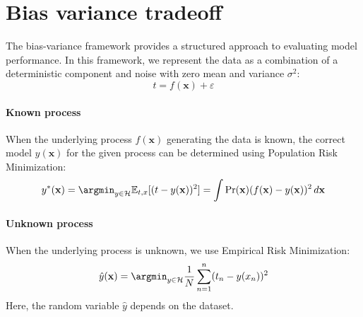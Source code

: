 \section{Bias variance tradeoff}

The bias-variance framework provides a structured approach to evaluating model performance. 
In this framework, we represent the data as a combination of a deterministic component and noise with zero mean and variance $\sigma^2$:
\[t=f(\mathbf{x})+\varepsilon\]

\paragraph*{Known process}
When the underlying process $f(\mathbf{x})$ generating the data is known, the correct model $y(\mathbf{x})$ for the given process can be determined using Population Risk Minimization:
\[y^\ast(\mathbf{x})=\argmin_{y\in\mathcal{H}}\mathbb{E}_{t,x}[(t-y(\mathbf{x}))^2]=\int\Pr(\mathbf{x})(f(\mathbf{x})-y(\mathbf{x}))^2\,d\mathbf{x}\]

\paragraph*{Unknown process}
When the underlying process is unknown, we use Empirical Risk Minimization:
\[\hat{y}(\mathbf{x})=\argmin_{y\in\mathcal{H}}\dfrac{1}{N}\sum_{n=1}^n(t_n-y(x_n))^2\]
Here, the random variable $\hat{y}$ depends on the dataset. 

